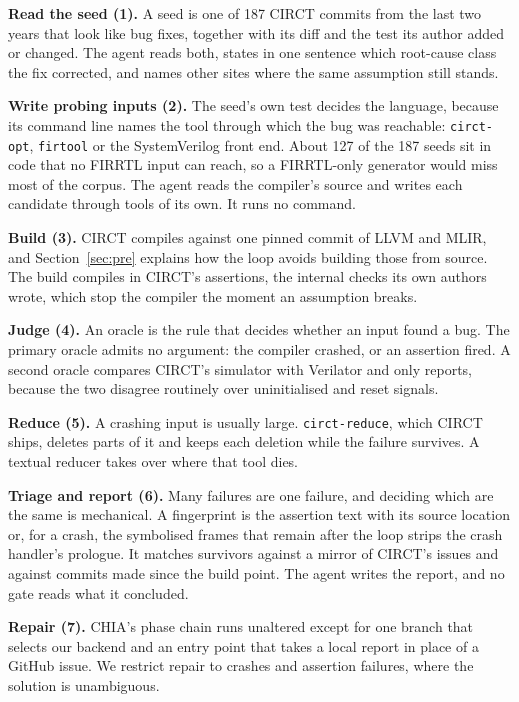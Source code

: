 \documentclass[conference]{IEEEtran}
\begin{document}
\textbf{Read the seed (1).} A seed is one of 187 CIRCT commits from the last two
years that look like bug fixes, together with its diff and the test its author
added or changed. The agent reads both, states in one sentence which root-cause
class the fix corrected, and names other sites where the same assumption still
stands. %

\textbf{Write probing inputs (2).} The seed's own test decides the language,
because its command line names the tool through which the bug was reachable:
\texttt{circt-opt}, \texttt{firtool} or the SystemVerilog front end. About 127
of the 187 seeds sit in code that no FIRRTL input can reach, so a FIRRTL-only
generator would miss most of the corpus. The agent reads the compiler's source
and writes each candidate through tools of its own. It runs no command.

\textbf{Build (3).} CIRCT compiles against one pinned commit of LLVM and MLIR,
and Section~\ref{sec:pre} explains how the loop avoids building those from
source. The build compiles in CIRCT's assertions, the internal checks its own
authors wrote, which stop the compiler the moment an assumption breaks.

\textbf{Judge (4).} An oracle is the rule that decides whether an input found a
bug. The primary oracle admits no argument: the compiler crashed, or an
assertion fired. A second oracle compares CIRCT's simulator with Verilator and
only reports, because the two disagree routinely over uninitialised and reset
signals.

\textbf{Reduce (5).} A crashing input is usually large. \texttt{circt-reduce},
which CIRCT ships, deletes parts of it and keeps each deletion while the failure
survives. A textual reducer takes over where that tool dies.

\textbf{Triage and report (6).} Many failures are one failure, and deciding
which are the same is mechanical. A fingerprint is the assertion text with its
source location or, for a crash, the symbolised frames that remain after the
loop strips the crash handler's prologue. It matches survivors against a mirror of
CIRCT's issues and against commits made since the build point. The agent writes
the report, and no gate reads what it concluded. %

\textbf{Repair (7).} CHIA's phase chain runs unaltered except for one branch
that selects our backend and an entry point that takes a local report in place
of a GitHub issue. We restrict repair to crashes and assertion failures, where the solution is unambiguous.
\end{document}
